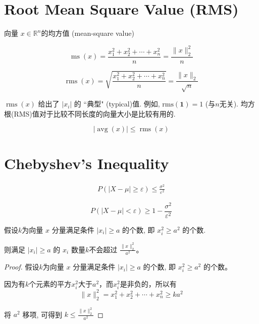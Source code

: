 \section{Root Mean Square Value (RMS)}

\begin{definition}
    向量 $ x \in \mathbb{R}^n $的均方值 (mean-square value)

    $$\operatorname{ms}(x) = \frac{x_{1}^{2}+x_{2}^{2}+\cdots+x_{n}^{2}}{n}=\frac{\|x\|_{2}^{2}}{n} $$
\end{definition}

\begin{definition}
    $$ \operatorname{rms}(x)=\sqrt{\frac{x_{1}^{2}+x_{2}^{2}+\cdots+x_{n}^{2}}{n}}=\frac{\|x\|_{2}}{\sqrt{n}} $$
\end{definition}

$ \operatorname{rms}(x) $ 给出了 $ \left|x_{i}\right| $ 的 “典型" (typical)值. 例如, $ \mathrm{rms}(\mathbf{1})=1 $ (与$n$无关). 均方根(RMS)值对于比较不同长度的向量大小是比较有用的. 

\begin{theorem}
    $$ |\operatorname{avg}(x)| \leq \operatorname{r m s}(x) $$
\end{theorem}

\section{Chebyshev's Inequality}

\begin{theorem}
$$
\begin{aligned}
    P(|X-\mu| \ge \varepsilon) \le \frac{\sigma^2}{\varepsilon^2}
\end{aligned}
$$

$$
 P(|X-\mu| < \varepsilon) \ge 1 - \frac{\sigma^2}{\varepsilon^2}
$$
\end{theorem}

    

   
\begin{theorem}
    假设$k$为向量 $ x $ 分量满足条件 $ \left|x_{i}\right| \geq a $ 的个数, 即 $ x_{i}^{2} \geq a^{2} $ 的个数. 

    则满足 $ \left|x_{i}\right| \geq a $ 的 $ x_{i} $ 数量$k$不会超过 $ \frac{\| x \|_{2}^{2}}{a^{2}} $。
\end{theorem}

\begin{proof}
    假设$k$为向量 $ x $ 分量满足条件 $ \left|x_{i}\right| \geq a $ 的个数, 即 $ x_{i}^{2} \geq a^{2} $ 的个数。
    
    因为有$k$个元素的平方$x_i^2$大于$a^{2}$，而$x_i^2$是非负的，所以有
    $$ \|x\|_{2}^{2}=x_{1}^{2}+x_{2}^{2}+\cdots+x_{n}^{2} \geq k a^{2} $$

    将 $ a^{2} $ 移项, 可得到 $ k \leq \frac{\|x\|_{2}^{2}}{a^{2}} $
\end{proof}

